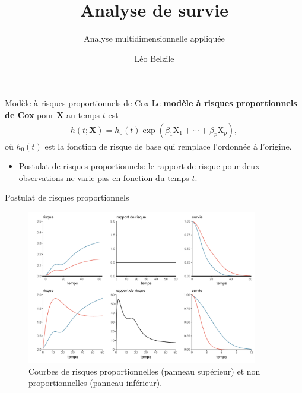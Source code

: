 \documentclass[
  ignorenonframetext,
]{beamer}
\title{Analyse de survie}
\subtitle{Analyse multidimensionnelle appliquée}
\author{Léo Belzile}
\date{}
\institute{HEC Montréal}
\providecommand{\tightlist}{%
  \setlength{\itemsep}{0pt}\setlength{\parskip}{0pt}}\usepackage{longtable,booktabs,array}
\begin{document}
\frame{\titlepage}
\ifdefined\Shaded\renewenvironment{Shaded}{\begin{tcolorbox}[boxrule=0pt, sharp corners, interior hidden, borderline west={3pt}{0pt}{shadecolor}, enhanced, frame hidden, breakable]}{\end{tcolorbox}}\fi

\begin{frame}{Modèle à risques proportionnels de Cox}
\protect\hypertarget{moduxe8le-uxe0-risques-proportionnels-de-cox}{}
Le \textbf{modèle à risques proportionnels de Cox} pour \(\mathbf{X}\)
au temps \(t\) est \begin{align*}
h(t; \mathbf{X}) = h_0(t)\exp(\beta_1\mathrm{X}_1 + \cdots + \beta_p \mathrm{X}_p),
\end{align*} où \(h_0(t)\) est la fonction de risque de base qui
remplace l'ordonnée à l'origine.

\begin{itemize}
\tightlist
\item
  Postulat de risques proportionnels: le rapport de risque pour deux
  observations ne varie pas en fonction du temps \(t\).
\end{itemize}
\end{frame}

\begin{frame}{Postulat de risques proportionnels}
\protect\hypertarget{postulat-de-risques-proportionnels}{}
\begin{figure}

{\centering \includegraphics[width=0.9\textwidth,height=\textheight]{MATH60602-diapos9_files/figure-beamer/fig-risquepropfig-1.pdf}

}

\caption{\label{fig-risquepropfig}Courbes de risques proportionnelles
(panneau supérieur) et non proportionnelles (panneau inférieur).}

\end{figure}
\end{frame}
\end{document}
